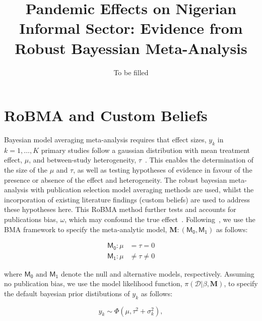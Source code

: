 \documentclass[12pt, english]{article}
\title{Pandemic Effects on Nigerian Informal Sector: Evidence from Robust Bayessian Meta-Analysis}
\author{To be filled}
\begin{document}
    \maketitle
    \newpage
    \tableofcontents

    \newpage
    \abstract
    \newpage


    \section{RoBMA and Custom Beliefs}\label{sec2.3:robma-custom-beliefs}
    Bayesian model averaging meta-analysis requires that effect sizes, $y_k$ in $k = 1, \dots, K$ primary studies follow a gaussian distribution with mean treatment effect, $\mu$, and between-study heterogeneity, $\tau$~\parencite{bartos2021bma}. This enables the determination of the size of the $\mu$ and $\tau$, as well as testing hypotheses of evidence in favour of the presence or absence of the effect and heterogeneity. The robust bayesian meta-analysis with publication selection model averaging methods are used, whilst the incorporation of existing literature findings (custom beliefs) are used to address these hypotheses here. This RoBMA method further tests and accounts for publications bias, $\omega$, which may confound the true effect~\parencite{maier2022, bartos2021}. Following~\parencite{maier2022, bartos2021}, we use the BMA framework to specify the meta-analytic model, $\mathbf{M}: (\mathsf{M_0}, \mathsf{M_1})$ as follows:

    \begin{align}
        \mathsf{M_0}: \mu &= \tau = 0 \label{equ1:bma-null-model} \\
        \mathsf{M_1}: \mu &\neq \tau \neq 0 \label{equ2:bma-alt-model}
    \end{align}

    where $\mathsf{M_0} \text{ and } \mathsf{M_1}$ denote the null and alternative models, respectively. Assuming no publication bias, we use the model likelihood function, $\pi \left(\mathcal{D} | \beta, \mathbf{M} \right)$, to specify the default bayesian prior distibutions of $y_k$ as follows:

    \begin{equation}
        \label{equ3:bayesian-priors}
        y_k \sim \Phi \left (\mu, \tau^{2} + \sigma_k^{2} \right),
    \end{equation}
\end{document}
